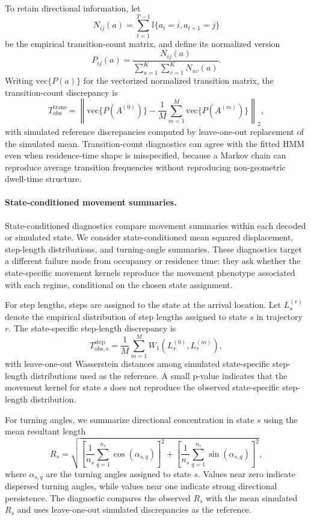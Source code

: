 \documentclass[11pt]{article}
\newcommand{\ind}{\mathbb{I}}
\begin{document}
To retain directional information, let
\[
  N_{ij}(a)
  =
  \sum_{t=1}^{T-1}\ind\{a_t=i, a_{t+1}=j\}
\]
be the empirical transition-count matrix, and define its normalized version
\[
  P_{ij}(a)
  =
  \frac{N_{ij}(a)}{\sum_{u=1}^{K}\sum_{v=1}^{K}N_{uv}(a)}.
\]
Writing $\mathrm{vec}\{P(a)\}$ for the vectorized normalized transition matrix,
the transition-count discrepancy is
\begin{equation*}
  T_{\mathrm{obs}}^{\mathrm{trans}}
  =
  \left\|
    \mathrm{vec}\{P(A^{(0)})\}
    -
    \frac{1}{M}
    \sum_{m=1}^{M}
    \mathrm{vec}\{P(A^{(m)})\}
  \right\|_2,
\end{equation*}
with simulated reference discrepancies computed by leave-one-out replacement
of the simulated mean. Transition-count diagnostics can agree with the fitted
HMM even when residence-time shape is misspecified, because a Markov chain can
reproduce average transition frequencies without reproducing non-geometric
dwell-time structure.

\paragraph{State-conditioned movement summaries.}
State-conditioned diagnostics compare movement summaries within each decoded or
simulated state. We consider state-conditioned mean squared displacement,
step-length distributions, and turning-angle summaries. These diagnostics
target a different failure mode from occupancy or residence time: they ask
whether the state-specific movement kernels reproduce the movement phenotype
associated with each regime, conditional on the chosen state assignment.

For step lengths, steps are assigned to the state at the arrival location. Let
$L_s^{(r)}$ denote the empirical distribution of step lengths assigned to state
$s$ in trajectory $r$. The state-specific step-length discrepancy is
\begin{equation*}
  T_{\mathrm{obs},s}^{\mathrm{step}}
  =
  \frac{1}{M}
  \sum_{m=1}^{M}
  W_1(L_s^{(0)},L_s^{(m)}),
\end{equation*}
with leave-one-out Wasserstein distances among simulated state-specific
step-length distributions used as the reference. A small p-value indicates
that the movement kernel for state $s$ does not reproduce the observed
state-specific step-length distribution.

For turning angles, we summarize directional concentration in state $s$ using
the mean resultant length
\begin{equation*}
  R_s
  =
  \sqrt{
    \left[
      \frac{1}{n_s}\sum_{q=1}^{n_s}\cos(\alpha_{s,q})
    \right]^2
    +
    \left[
      \frac{1}{n_s}\sum_{q=1}^{n_s}\sin(\alpha_{s,q})
    \right]^2
  },
\end{equation*}
where $\alpha_{s,q}$ are the turning angles assigned to state $s$. Values near
zero indicate dispersed turning angles, while values near one indicate strong
directional persistence. The diagnostic compares the observed $R_s$ with the
mean simulated $R_s$ and uses leave-one-out simulated discrepancies as the
reference.
\end{document}
